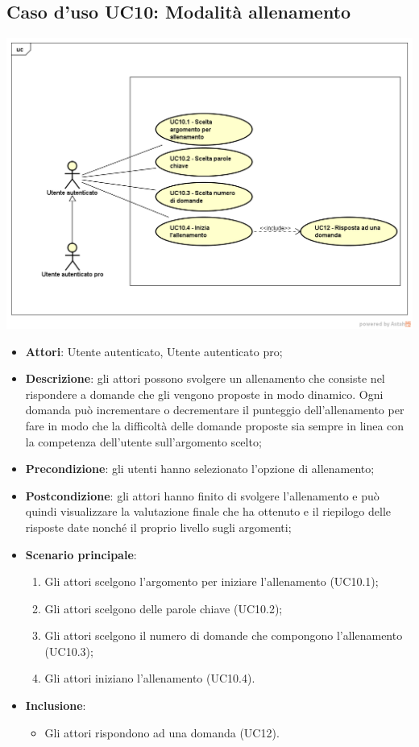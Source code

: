 \subsection{Caso d'uso UC10: Modalità allenamento}
\label{UC10}
	\begin{center}
	\centering
	\includegraphics[scale=0.5]{UML/UC10.png}
	\end{center}
\FloatBarrier
\begin{itemize}
\item\textbf{Attori}: Utente autenticato, Utente autenticato pro;
\item\textbf{Descrizione}: gli attori possono svolgere un allenamento che consiste nel rispondere a domande che gli vengono proposte in modo dinamico. Ogni domanda può incrementare o decrementare il punteggio dell'allenamento per fare in modo che la difficoltà delle domande proposte sia sempre in linea con la competenza dell'utente sull'argomento scelto;
\item\textbf{Precondizione}: gli utenti hanno selezionato l'opzione di allenamento;
\item\textbf{Postcondizione}: gli attori hanno finito di svolgere l'allenamento e può quindi visualizzare la valutazione finale che ha ottenuto e il riepilogo delle risposte date nonché il proprio livello sugli argomenti;
\item\textbf{Scenario principale}:
	\begin{enumerate}
		\item Gli attori scelgono l'argomento per iniziare l'allenamento (UC10.1);
		\item Gli attori scelgono delle parole chiave (UC10.2);
		\item Gli attori scelgono il numero di domande che compongono l'allenamento (UC10.3);
		\item Gli attori iniziano l'allenamento (UC10.4).
	\end{enumerate}
\item \textbf{Inclusione}:
	\begin{itemize}
		\item Gli attori rispondono ad una domanda (UC12).
	\end{itemize}
\end{itemize}

